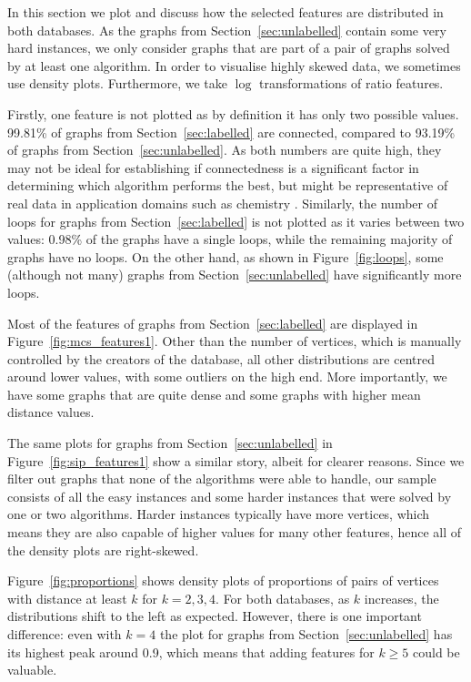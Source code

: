 \documentclass{l4proj}
\theoremstyle{definition}
\theoremstyle{remark}
\begin{document}
In this section we plot and discuss how the selected features are distributed in
both databases. As the graphs from Section~\ref{sec:unlabelled} contain some
very hard instances, we only consider graphs that are part of a pair of graphs
solved by at least one algorithm. In order to visualise highly skewed data, we
sometimes use density plots. Furthermore, we take $\log$ transformations of
ratio features.

Firstly, one feature is not plotted as by definition it has only two possible
values. 99.81\% of graphs from Section~\ref{sec:labelled} are connected,
compared to 93.19\% of graphs from Section~\ref{sec:unlabelled}. As both numbers
are quite high, they may not be ideal for establishing if connectedness is a
significant factor in determining which algorithm performs the best, but might
be representative of real data in application domains such as chemistry
\cite{WCMS:WCMS5}. Similarly, the number of loops for graphs from
Section~\ref{sec:labelled} is not plotted as it varies between two values:
0.98\% of the graphs have a single loops, while the remaining majority of graphs
have no loops. On the other hand, as shown in Figure~\ref{fig:loops}, some
(although not many) graphs from Section~\ref{sec:unlabelled} have significantly
more loops.

Most of the features of graphs from Section~\ref{sec:labelled} are displayed in
Figure~\ref{fig:mcs_features1}. Other than the number of vertices, which is
manually controlled by the creators of the database, all other distributions are
centred around lower values, with some outliers on the high end. More
importantly, we have some graphs that are quite dense and some graphs with
higher mean distance values.

The same plots for graphs from Section~\ref{sec:unlabelled} in
Figure~\ref{fig:sip_features1} show a similar story, albeit for clearer reasons.
Since we filter out graphs that none of the algorithms were able to handle, our
sample consists of all the easy instances and some harder instances that were
solved by one or two algorithms. Harder instances typically have more vertices,
which means they are also capable of higher values for many other features,
hence all of the density plots are right-skewed.

Figure~\ref{fig:proportions} shows density plots of proportions of pairs of
vertices with distance at least $k$ for $k = 2, 3, 4$. For both databases, as
$k$ increases, the distributions shift to the left as expected. However, there
is one important difference: even with $k = 4$ the plot for graphs from
Section~\ref{sec:unlabelled} has its highest peak around 0.9, which means that
adding features for $k \ge 5$ could be valuable. 
\end{document}
